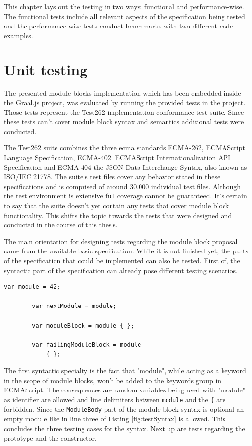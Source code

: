 This chapter lays out the testing in two ways: functional and performance-wise. The functional tests include all relevant aspects of the specification being tested and the performance-wise tests conduct benchmarks with two different code examples.

\section{Unit testing}

The presented module blocks implementation which has been embedded inside the Graal.js project, was evaluated by running the provided tests in the project. Those tests represent the Test262 implementation conformance test suite. \cite{ecmaTest262} Since these tests can't cover module block syntax and semantics additional tests were conducted.

The Test262 suite combines the three ecma standards ECMA-262, ECMAScript Language Specification, ECMA-402, ECMAScript Internationalization API Specification and ECMA-404 the JSON Data Interchange Syntax, also known as ISO/IEC 21778. The suite's test files cover any  behavior stated in these specifications and is comprised of around 30.000 individual test files. \cite{ecmaTest262, ecmaTestSpec} Although the test environment is extensive full coverage cannot be guaranteed. It's certain to say that the suite doesn't yet contain any tests that cover module block functionality. This shifts the topic towards the tests that were designed and conducted in the course of this thesis.

The main orientation for designing tests regarding the module block proposal came from the available basic specification. While it is not finished yet, the parts of the specification that could be implemented can also be tested. First of, the syntactic part of the specification can already pose different testing scenarios.

    \begin{lstlisting}[caption={Module block syntax tests}, label={fig:testSyntax}]
        var module = 42;
        
        var nextModule = module;
        
        var moduleBlock = module { };
        
        var failingModuleBlock = module
            { };
    \end{lstlisting}

The first syntactic specialty is the fact that "module", while acting as a keyword in the scope of module blocks, won't be added to the keywords group in ECMAScript. The consequences are random variables being used with "module" as identifier are allowed and line delimiters between \texttt{module} and the \texttt{\{} are forbidden. Since the \texttt{ModuleBody} part of the module block syntax  is optional an empty module like in line three of Listing \ref{fig:testSyntax} is allowed. This concludes the three testing cases for the syntax. Next up are tests regarding the prototype and the constructor.

